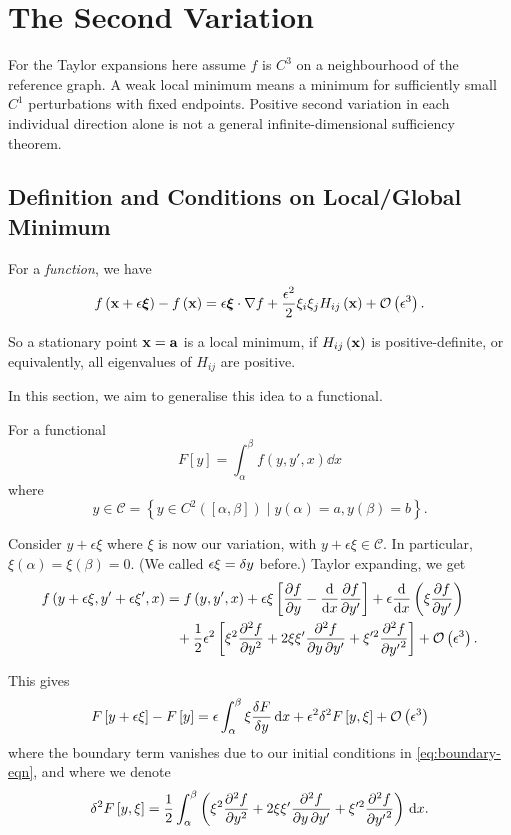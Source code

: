 \documentclass[11pt]{article}
\numberwithin{equation}{section}
\theoremstyle{definition}
\theoremstyle{remark}
\newcommand{\pqty}[1]{\left(#1\right)}
\newcommand{\bqty}[1]{\left[#1\right]}
\newcommand{\set}[2]{\left\{#1\mid #2\right\}}
\newcommand{\ccintv}[2]{[#1,#2]}
\newcommand{\grad}{\nabla}
\newcommand{\vdot}{\cdot}
\newcommand{\bigO}{\mathcal{O}}
\newcommand{\contClass}[1]{C^{#1}}
\newcommand{\contClassSymb}{\mathcal{C}}
\newcommand{\fdv}[2]{\frac{\delta #1}{\delta #2}}
\begin{document}
\section{The Second Variation}
For the Taylor expansions here assume \(f\) is \(C^3\) on a neighbourhood of the reference graph. A weak local minimum means a minimum for sufficiently small \(C^1\) perturbations with fixed endpoints. Positive second variation in each individual direction alone is not a general infinite-dimensional sufficiency theorem.

\subsection{Definition and Conditions on Local/Global Minimum}

For a \emph{function}, we have
\[
    f\pqty{\vb{x} + \epsilon \vb*{\xi}} - f\pqty{\vb{x}} = \epsilon \vb*{\xi} \vdot \grad f + \frac{\epsilon^2}{2} \xi_i \xi_j H_{ij} \pqty{\vb{x}} + \bigO \pqty{\epsilon^3}.
\]

So a stationary point \(\vb{x} = \vb{a}\) is a local minimum, if \(H_{ij} \pqty{\vb{x}}\) is positive-definite, or equivalently, all eigenvalues of \(H_{ij}\) are positive.

In this section, we aim to generalise this idea to a functional.

For a functional
\[
    F \bqty{y} = \int_{\alpha}^{\beta} f\pqty{y, y', x} \dd{x}
\]
where
\begin{equation}
    \label{eq:boundary-eqn}%
    y \in \contClassSymb = \set{y \in \contClass{2} \pqty{\ccintv{\alpha}{\beta}}}{y\pqty{\alpha} = a, y\pqty{\beta} = b}.
\end{equation}

Consider \(y + \epsilon \xi\) where \(\xi\) is now our variation, with \(y + \epsilon \xi \in \contClassSymb\). In particular, \(\xi\pqty{\alpha} = \xi\pqty{\beta} = 0\). (We called \(\epsilon \xi = \var{y}\) before.) Taylor expanding, we get
\begin{align*}
    f\pqty{y + \epsilon \xi, y' + \epsilon \xi', x} &= f\pqty{y, y', x} + \epsilon \xi \bqty{\pdv{f}{y} - \dv{x} \pdv{f}{y'}} + \epsilon \dv{x} \pqty{\xi \pdv{f}{y'}} \\
    &\phantom{=} + \frac{1}{2} \epsilon^2 \bqty{\xi^2 \pdv[2]{f}{y} + 2 \xi \xi' \pdv{f}{y}{y'} + \xi'^2 \pdv[2]{f}{{y'}}} + \bigO\pqty{\epsilon^3}.
\end{align*}

This gives
\[
    F\bqty{y + \epsilon \xi} - F\bqty{y} = \epsilon \int_{\alpha}^{\beta} \xi \fdv{F}{y} \dd{x} + \epsilon^2 \var[2]{F\bqty{y, \xi}} + \bigO\pqty{\epsilon^3}
\]
where the boundary term vanishes due to our initial conditions in \autoref{eq:boundary-eqn}, and where we denote
\[
    \var[2]{F\bqty{y, \xi}} = \frac{1}{2} \int_{\alpha}^{\beta} \pqty{\xi^2 \pdv[2]{f}{y} + 2 \xi \xi' \pdv{f}{y}{y'} + \xi'^2 \pdv[2]{f}{{y'}}} \dd{x}.
\]
\end{document}
